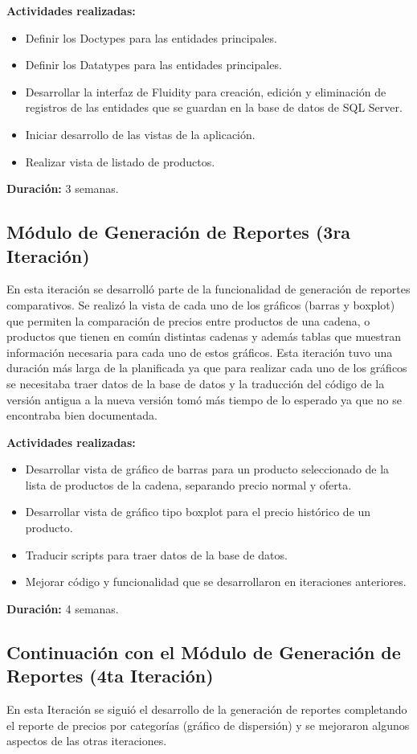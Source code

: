 \textbf{Actividades realizadas:}
\begin{itemize}
   \item Definir los Doctypes para las entidades principales.
   \item Definir los Datatypes para las entidades principales.
   \item Desarrollar la interfaz de Fluidity para creación, edición y eliminación de registros de las entidades que se guardan en la base de datos de SQL Server.
   \item Iniciar desarrollo de las vistas de la aplicación.
   \item Realizar vista de listado de productos.
\end{itemize}


\textbf{Duración:} 3 semanas.

\subsection{Módulo de Generación de Reportes (3ra Iteración)}
En esta iteración se desarrolló parte de la funcionalidad de generación de reportes comparativos. Se realizó la vista de cada uno de los gráficos (barras y boxplot) que permiten la comparación de precios entre productos de una cadena, o productos que tienen en común distintas cadenas y además tablas que muestran información necesaria para cada uno de estos gráficos. Esta iteración tuvo una duración más larga de la planificada ya que para realizar cada uno de los gráficos se necesitaba traer datos de la base de datos y la traducción del código de la versión antigua a la nueva versión tomó más tiempo de lo esperado ya que no se encontraba bien documentada.


\textbf{Actividades realizadas:}
\begin{itemize}
   \item Desarrollar vista de gráfico de barras para un producto seleccionado de la lista de productos de la cadena, separando precio normal y oferta.
   \item Desarrollar vista de gráfico tipo boxplot para el precio histórico de un producto.
   \item Traducir scripts para traer datos de la base de datos.
   \item Mejorar código y funcionalidad que se desarrollaron en iteraciones anteriores.
\end{itemize}


\textbf{Duración:} 4 semanas.

\subsection{Continuación con el Módulo de Generación de Reportes (4ta Iteración)}
En esta Iteración se siguió el desarrollo de la generación de reportes completando el reporte de precios por categorías (gráfico de dispersión) y se mejoraron algunos aspectos de las otras iteraciones.

